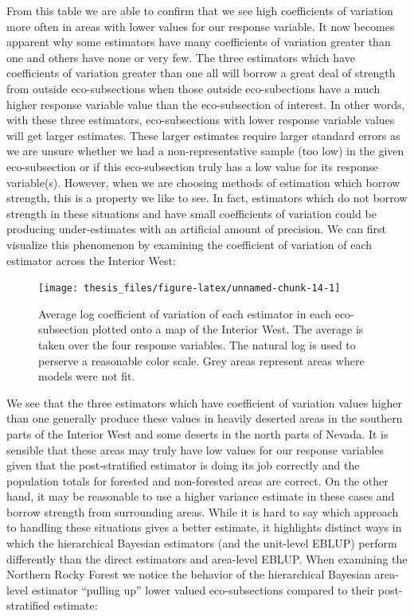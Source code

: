 \documentclass[12pt,twoside]{reedthesis}
\begin{document}
From this table we are able to confirm that we see high coefficients of variation more often in areas with lower values for our response variable. It now becomes apparent why some estimators have many coefficients of variation greater than one and others have none or very few. The three estimators which have coefficients of variation greater than one all will borrow a great deal of strength from outside eco-subsections when those outside eco-subections have a much higher response variable value than the eco-subsection of interest. In other words, with these three estimators, eco-subsections with lower response variable values will get larger estimates. These larger estimates require larger standard errors as we are unsure whether we had a non-representative sample (too low) in the given eco-subsection or if this eco-subsection truly has a low value for its response variable(s). However, when we are choosing methods of estimation which borrow strength, this is a property we like to see. In fact, estimators which do not borrow strength in these situations and have small coefficients of variation could be producing under-estimates with an artificial amount of precision. We can first visualize this phenomenon by examining the coefficient of variation of each estimator across the Interior West:
\begin{figure}

{\centering \texttt{[image: thesis\_files/figure-latex/unnamed-chunk-14-1]} 

}

\caption[Coefficient of variation map]{Average log coefficient of variation of each estimator in each eco-subsection plotted onto a map of the Interior West. The average is taken over the four response variables. The natural log is used to perserve a reasonable color scale. Grey areas represent areas where models were not fit.}\label{fig:unnamed-chunk-14}
\end{figure}
We see that the three estimators which have coefficient of variation values higher than one generally produce these values in heavily deserted areas in the southern parts of the Interior West and some deserts in the north parts of Nevada. It is sensible that these areas may truly have low values for our response variables given that the post-stratified estimator is doing its job correctly and the population totals for forested and non-forested areas are correct. On the other hand, it may be reasonable to use a higher variance estimate in these cases and borrow strength from surrounding areas. While it is hard to say which approach to handling these situations gives a better estimate, it highlights distinct ways in which the hierarchical Bayesian estimators (and the unit-level EBLUP) perform differently than the direct estimators and area-level EBLUP. When examining the Northern Rocky Forest we notice the behavior of the hierarchical Bayesian area-level estimator ``pulling up'' lower valued eco-subsections compared to their post-stratified estimate:
\end{document}
